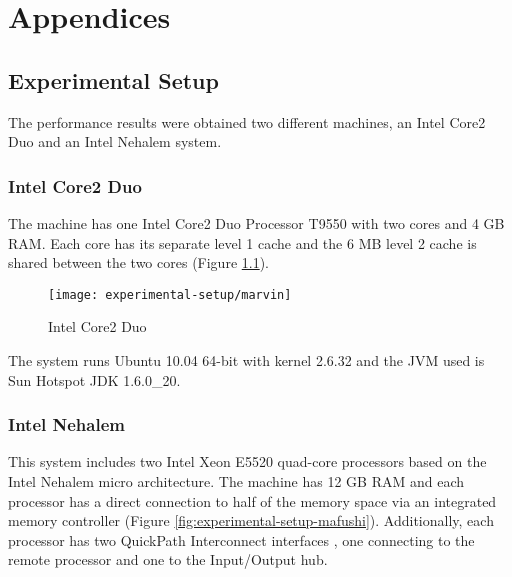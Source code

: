 
\part{Appendices}
\label{part:appendices}

\chapter{Experimental Setup}
\label{chap:experimental-setup}

The performance results were obtained two different machines, an Intel
Core2 Duo and an Intel Nehalem system.

\section{Intel Core2 Duo}
\label{sec:experimental-setup-marvin}

The machine has one Intel Core2 Duo Processor T9550 with two cores and
4 GB RAM. Each core has its separate level 1 cache and the 6 MB level
2 cache is shared between the two cores (Figure
\ref{fig:experimental-setup-marvin}).

\begin{figure}[htb]
  \centering
  \texttt{[image: experimental-setup/marvin]}
  \caption{Intel Core2 Duo}
  \label{fig:experimental-setup-marvin}
\end{figure}

The system runs Ubuntu 10.04 64-bit with kernel 2.6.32 and the JVM
used is Sun Hotspot JDK 1.6.0\_20.

\section{Intel Nehalem}
\label{sec:experimental-setup-mafushi}

This system includes two Intel Xeon E5520 quad-core processors based
on the Intel Nehalem micro architecture. The machine has 12 GB RAM and
each processor has a direct connection to half of the memory space via
an integrated memory controller (Figure
\ref{fig:experimental-setup-mafushi}). Additionally, each processor
has two QuickPath Interconnect interfaces \cite{Maddox2009}, one
connecting to the remote processor and one to the Input/Output hub.

